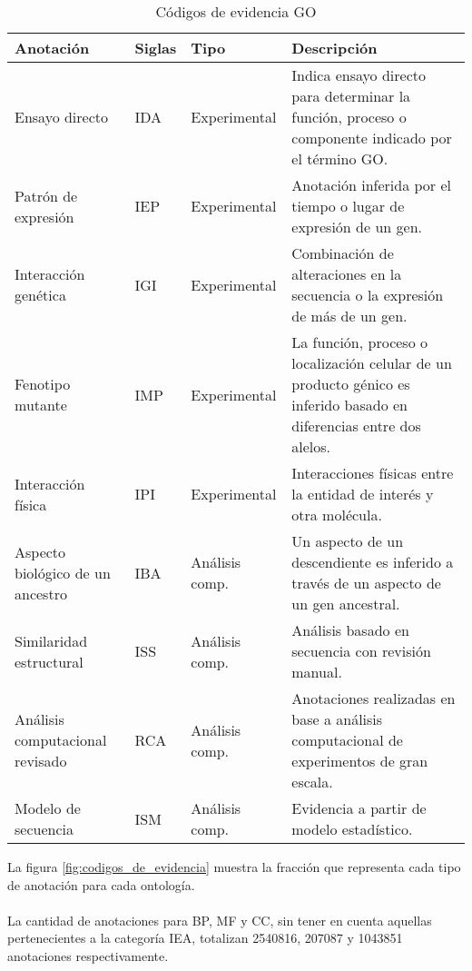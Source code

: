 \begin{sidewaystable}
\centering
\begin{tabular}{| p{4cm} | p{1cm} | p{3cm} | p{8cm} |}
\hline
Anotación & Siglas & Tipo & Descripción \\
\hline
Ensayo directo        & IDA & Experimental & Indica ensayo directo para determinar la función, proceso o componente indicado por el término GO. \\
\hline
Patrón de expresión   & IEP & Experimental & Anotación inferida por el tiempo o lugar de expresión de un gen. \\
\hline
Interacción genética  & IGI & Experimental & Combinación de alteraciones en la secuencia o la expresión de más de un gen.\\
\hline
Fenotipo mutante      & IMP & Experimental & La función, proceso o localización celular de un producto génico es inferido basado en diferencias entre dos alelos.\\
\hline
Interacción física    & IPI & Experimental & Interacciones físicas entre la entidad de interés y otra molécula.\\                                    
\hline
Aspecto biológico de un ancestro & IBA & Análisis comp. & Un aspecto de un descendiente es inferido a través de un aspecto de un gen ancestral.\\                                             
\hline
Similaridad estructural & ISS & Análisis comp. & Análisis basado en secuencia con revisión manual.\\                                             
\hline
Análisis computacional revisado & RCA & Análisis comp. & Anotaciones realizadas en base a análisis computacional de experimentos de gran escala.\\    
\hline                                         
Modelo de secuencia & ISM & Análisis comp. & Evidencia a partir de modelo estadístico.\\                                             
\hline
\end{tabular}
\caption{Códigos de evidencia GO}
\label{tab:tipos_de_anotaciones}
\end{sidewaystable}
La figura \ref{fig:codigos_de_evidencia} muestra la fracción que representa cada tipo de anotación para cada ontología.\\\\
La cantidad de anotaciones para BP, MF y CC, sin tener en cuenta aquellas pertenecientes a la categoría IEA, totalizan 2540816, 207087 y 1043851 anotaciones respectivamente.
